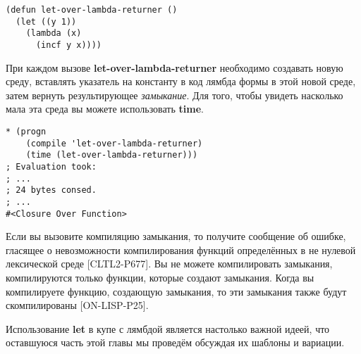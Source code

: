 \begin{verbatim}
(defun let-over-lambda-returner ()
  (let ((y 1))
    (lambda (x)
      (incf y x))))
\end{verbatim}

При каждом вызове \textbf{let-over-lambda-returner} необходимо создавать новую среду, вставлять указатель на константу в код лямбда формы в этой новой среде, затем вернуть результирующее \emph{замыкание}. Для того, чтобы увидеть насколько мала эта среда вы можете использовать \textbf{time}.

\begin{verbatim}
* (progn
    (compile 'let-over-lambda-returner)
    (time (let-over-lambda-returner)))
; Evaluation took:
; ...
; 24 bytes consed.
; ...
#<Closure Over Function>
\end{verbatim}

Если вы вызовите компиляцию замыкания, то получите сообщение об ошибке, гласящее о невозможности компилирования функций определённых в не нулевой лексической среде [CLTL2-P677]. Вы не можете компилировать замыкания, компилируются только функции, которые создают замыкания. Когда вы компилируете функцию, создающую замыкания, то эти замыкания также будут скомпилированы [ON-LISP-P25].

Использование \textbf{let} в купе с лямбдой является настолько важной идеей, что оставшуюся часть этой главы мы проведём обсуждая их шаблоны и вариации.
